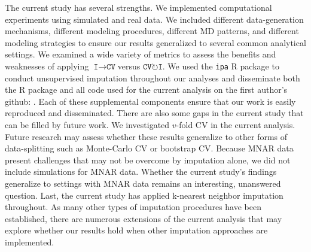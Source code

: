 \documentclass[AMA,STIX1COL,doublespace]{WileyNJD-v2}
\begin{document}
The current study has several strengths. We implemented computational
experiments using simulated and real data. We included different
data-generation mechanisms, different modeling procedures, different MD
patterns, and different modeling strategies to ensure our results
generalized to several common analytical settings. We examined a wide
variety of metrics to assess the benefits and weaknesses of applying
$\texttt{I}\!\!\rightarrow\!\texttt{CV}$\space versus
$\texttt{CV}\!\circlearrowright\!\texttt{I}$. We used the \texttt{ipa} R
package to conduct unsupervised imputation throughout our analyses and
disseminate both the R package and all code used for the current
analysis on the first author's github:
\href{https://github.com/bcjaeger/Imputation-and-CV}{}. Each of these
supplemental components ensure that our work is easily reproduced and
disseminated. There are also some gaps in the current study that can be
filled by future work. We investigated \(v\)-fold CV in the current
analysis. Future research may assess whether these results generalize to
other forms of data-splitting such as Monte-Carlo CV or bootstrap CV.
Because MNAR data present challenges that may not be overcome by
imputation alone, we did not include simulations for MNAR data. Whether
the current study's findings generalize to settings with MNAR data
remains an interesting, unanswered question. Last, the current study has
applied k-nearest neighbor imputation throughout. As many other types of
imputation procedures have been established, there are numerous
extensions of the current analysis that may explore whether our results
hold when other imputation approaches are implemented.

\FloatBarrier
\end{document}
